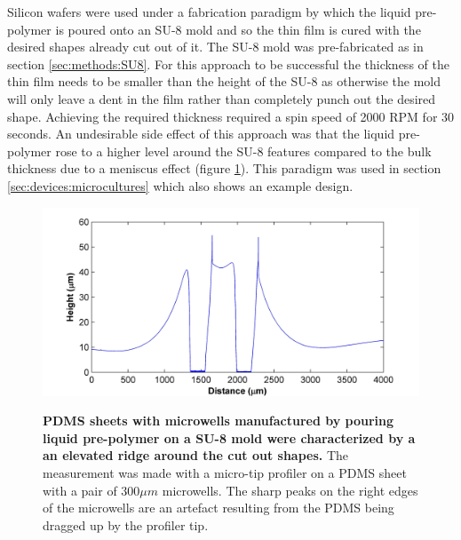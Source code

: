         Silicon wafers were used under a fabrication paradigm by which the liquid pre-polymer is poured onto an SU-8 mold and so the thin film is cured with the desired shapes already cut out of it. The SU-8 mold was pre-fabricated as in section \ref{sec:methods:SU8}. For this approach to be successful the thickness of the thin film needs to be smaller than the height of the SU-8 as otherwise the mold will only leave a dent in the film rather than completely punch out the desired shape. Achieving the required thickness required a spin speed of 2000 RPM for 30 seconds. An undesirable side effect of this approach was that the liquid pre-polymer rose to a higher level around the SU-8 features compared to the bulk thickness due to a meniscus effect (figure \ref{fig:methods:mwProfile}). This paradigm was used in section \ref{sec:devices:microcultures} which also shows an example design.

        \begin{figure}[h]
            \includegraphics[width=14cm]{chapter2/figures/mw_profile/mw_profile.jpg}
            \label{fig:methods:mwProfile}
            \caption[Representative profile of a PDMS with microwells manufactured by spinning liquid pre-polymer on a SU-8 mold]{\textbf{PDMS sheets with microwells manufactured by pouring liquid pre-polymer on a SU-8 mold were characterized by a an elevated ridge around the cut out shapes.} The measurement was made with a micro-tip profiler on a PDMS sheet with a pair of \(300 \mu m\) microwells. The sharp peaks on the right edges of the microwells are an artefact resulting from the PDMS being dragged up by the profiler tip.}
        \end{figure}


